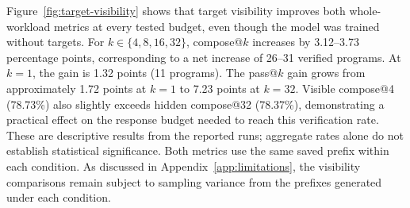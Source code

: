 Figure~\ref{fig:target-visibility} shows that target visibility improves both
whole-workload metrics at every tested budget, even though
the model was trained without targets.  For \(k\in\{4,8,16,32\}\),
compose@\(k\) increases by 3.12--3.73 percentage points, corresponding to
a net increase of 26--31 verified programs.  At \(k{=}1\), the gain is
1.32 points (11 programs).  The pass@\(k\) gain grows from approximately
1.72 points at \(k{=}1\) to 7.23 points at \(k{=}32\).
Visible compose@4 (78.73\%) also slightly exceeds hidden compose@32
(78.37\%), demonstrating a practical effect on the response budget needed
to reach this verification rate.  These are descriptive results from the
reported runs; aggregate rates alone do not establish statistical significance.
Both metrics use the same saved prefix within each condition.  As discussed
in Appendix~\ref{app:limitations}, the visibility comparisons remain subject
to sampling variance from the prefixes generated under each condition.

